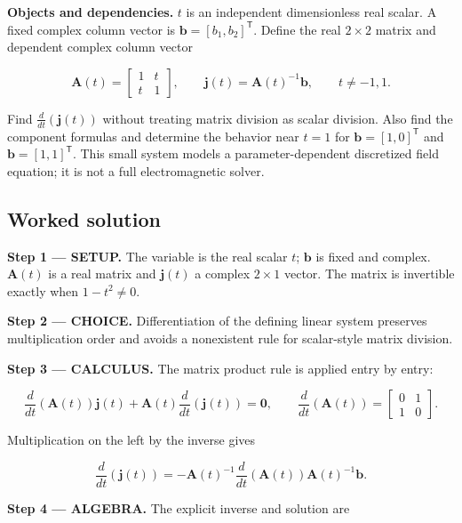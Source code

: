 \documentclass[11pt,oneside,openany]{book}
\begin{document}
\textbf{Objects and dependencies.} \(t\) is an independent dimensionless real scalar. A fixed complex column vector is \(\mathbf b=[b_1,b_2]^{\mathsf T}\). Define the real \(2\times2\) matrix and dependent complex column vector

\[
\mathbf A(t)=\begin{bmatrix}1&t\\t&1\end{bmatrix},\qquad
\mathbf j(t)=\mathbf A(t)^{-1}\mathbf b,\qquad t\ne-1,1.
\]

Find \(\frac{d}{dt}(\mathbf j(t))\) without treating matrix division as scalar division. Also find the component formulas and determine the behavior near \(t=1\) for \(\mathbf b=[1,0]^{\mathsf T}\) and \(\mathbf b=[1,1]^{\mathsf T}\). This small system models a parameter-dependent discretized field equation; it is not a full electromagnetic solver.
\subsection*{Worked solution}

\textbf{Step 1 --- SETUP.} The variable is the real scalar \(t\); \(\mathbf b\) is fixed and complex. \(\mathbf A(t)\) is a real matrix and \(\mathbf j(t)\) a complex \(2\times1\) vector. The matrix is invertible exactly when \(1-t^2\ne0\).

\begin{ChoiceStep}
\textbf{Step 2 --- CHOICE.} Differentiation of the defining linear system preserves multiplication order and avoids a nonexistent rule for scalar-style matrix division.

\end{ChoiceStep}
\textbf{Step 3 --- CALCULUS.} The matrix product rule is applied entry by entry:

\[
\frac{d}{dt}\left(\mathbf A(t)\right)\mathbf j(t)
+\mathbf A(t)\frac{d}{dt}\left(\mathbf j(t)\right)=\mathbf0,
\qquad \frac{d}{dt}\left(\mathbf A(t)\right)=\begin{bmatrix}0&1\\1&0\end{bmatrix}.
\]

Multiplication on the left by the inverse gives

\[
\frac{d}{dt}\left(\mathbf j(t)\right)
=-\mathbf A(t)^{-1}\frac{d}{dt}\left(\mathbf A(t)\right)\mathbf A(t)^{-1}\mathbf b.
\]

\begingroup\color{AlgebraBlue}
\textbf{Step 4 --- ALGEBRA.} The explicit inverse and solution are
\end{document}
